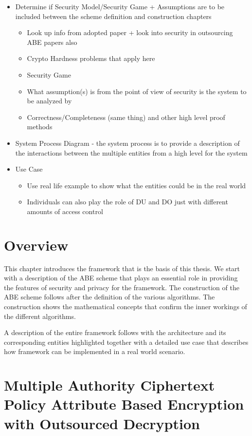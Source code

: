 {\begin{itemize}
	\item Determine if Security Model/Security Game + Assumptions are to be included between the scheme definition and construction chapters
	\begin{itemize}
		\item Look up info from adopted paper + look into security in outsourcing ABE papers also
		\item Crypto Hardness problems that apply here
		\item Security Game
		\item What assumption(s) is from the point of view of security is the system to be analyzed by
		\item Correctness/Completeness (same thing) and other high level proof methods
	\end{itemize}
	\item System Process Diagram - the system process is to provide a description of the interactions between the multiple entities from a high level for the system
	\item Use Case
	\begin{itemize}
		\item Use real life example to show what the entities could be in the real world
		\item Individuals can also play the role of DU and DO just with different amounts of access control
	\end{itemize}
\end{itemize}
}



\section{Overview}

This chapter introduces the framework that is the basis of this thesis. We start with a description of the ABE scheme that plays an essential role in providing the features of security and privacy for the framework. The construction of the ABE scheme follows after the definition of the various algorithms. The construction shows the mathematical concepts that confirm the inner workings of the different algorithms.

A description of the entire framework follows with the architecture and its corresponding entities highlighted together with a detailed use case that describes how framework can be implemented in a real world scenario.


\section{Multiple Authority Ciphertext Policy Attribute Based Encryption with Outsourced Decryption}

